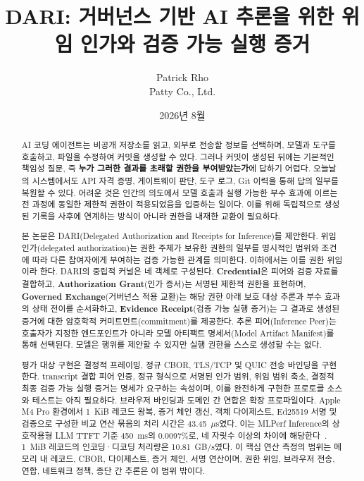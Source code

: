 \documentclass[10pt]{article}
\title{DARI: 거버넌스 기반 AI 추론을 위한 위임 인가와 검증 가능 실행 증거}
\author{Patrick Rho\\Patty Co., Ltd.}
\date{2026년 8월}
\newcommand{\dariname}{DARI}
\renewcommand{\emph}[1]{\textbf{#1}}
\begin{document}
\maketitle

\begin{abstract}
AI 코딩 에이전트는 비공개 저장소를 읽고, 외부로 전송할 정보를 선택하며, 모델과 도구를 호출하고, 파일을 수정하여 커밋을 생성할 수 있다. 그러나 커밋이 생성된 뒤에는 기본적인 책임성 질문, 즉 \emph{누가 그러한 결과를 초래할 권한을 부여받았는가}에 답하기 어렵다. 오늘날의 시스템에서도 API 자격 증명, 게이트웨이 판단, 도구 로그, Git 이력을 통해 답의 일부를 복원할 수 있다. 어려운 것은 인간의 의도에서 모델 호출과 실행 가능한 부수 효과에 이르는 전 과정에 동일한 제한적 권한이 적용되었음을 입증하는 일이다. 이를 위해 독립적으로 생성된 기록을 사후에 연계하는 방식이 아니라 권한을 내재한 교환이 필요하다.

본 논문은 \dariname{}(Delegated Authorization and Receipts for Inference)를 제안한다. 위임 인가(delegated authorization)는 권한 주체가 보유한 권한의 일부를 명시적인 범위와 조건에 따라 다른 참여자에게 부여하는 검증 가능한 관계를 의미한다. 이하에서는 이를 권한 위임이라 한다. DARI의 중립적 커널은 네 객체로 구성된다. \emph{Credential}은 피어와 검증 자료를 결합하고, \emph{Authorization Grant}(인가 증서)는 서명된 제한적 권한을 표현하며, \emph{Governed Exchange}(거버넌스 적용 교환)는 해당 권한 아래 보호 대상 추론과 부수 효과의 상태 전이를 순서화하고, \emph{Evidence Receipt}(검증 가능 실행 증거)는 그 결과로 생성된 증거에 대한 암호학적 커미트먼트(commitment)를 제공한다. 추론 피어(Inference Peer)는 호출자가 지정한 엔드포인트가 아니라 모델 아티팩트 명세서(Model Artifact Manifest)를 통해 선택된다. 모델은 행위를 제안할 수 있지만 실행 권한을 스스로 생성할 수는 없다.

평가 대상 구현은 결정적 프레이밍, 정규 CBOR, TLS/TCP 및 QUIC 전송 바인딩을 구현한다. transcript 결합 피어 인증, 정규 형식으로 서명된 인가 범위, 위임 범위 축소, 결정적 최종 검증 가능 실행 증거는 명세가 요구하는 속성이며, 이를 완전하게 구현한 프로토콜 소스와 테스트는 아직 필요하다. 브라우저 바인딩과 도메인 간 연합은 확장 프로파일이다. Apple M4 Pro 환경에서 1~KiB 레코드 왕복, 증거 체인 갱신, 객체 다이제스트, Ed25519 서명 및 검증으로 구성한 비교 연산 묶음의 처리 시간은 43.45~$\mu$s였다. 이는 MLPerf Inference의 상호작용형 LLM TTFT 기준 450~ms의 0.0097\%로, 네 자릿수 이상의 차이에 해당한다~\cite{mlperf2025llm}. 1~MiB 레코드의 인코딩·디코딩 처리량은 10.81~GB/s였다. 이 핵심 연산 측정의 범위는 메모리 내 레코드, CBOR, 다이제스트, 증거 체인, 서명 연산이며, 권한 위임, 브라우저 전송, 연합, 네트워크 정책, 종단 간 추론은 이 범위 밖이다.
\end{abstract}
\end{document}
